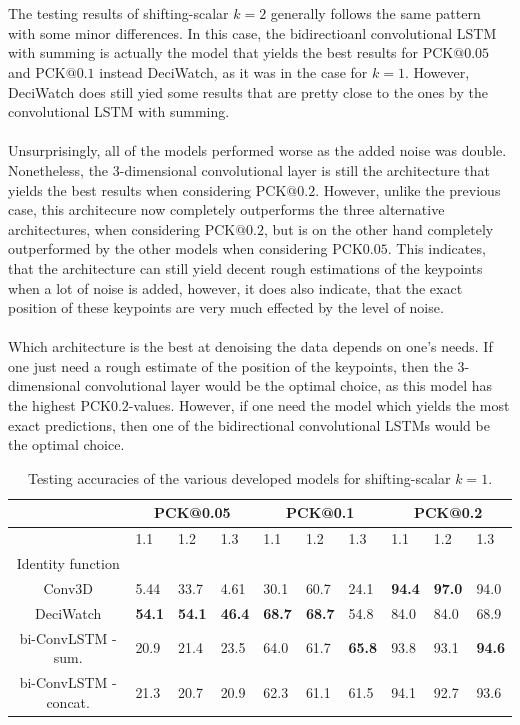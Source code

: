 \documentclass[./main.tex]{subfiles}
\begin{document}
\\
\\
The testing results of shifting-scalar $k = 2$ generally follows the same pattern with some minor differences. In this case, the bidirectioanl convolutional LSTM with summing is actually the model that yields the best results for PCK$@0.05$ and PCK$@0.1$ instead DeciWatch, as it was in the case for $k = 1$. However, DeciWatch does still yied some results that are pretty close to the ones by the convolutional LSTM with summing.
\\
\\
Unsurprisingly, all of the models performed worse as the added noise was double. Nonetheless, the 3-dimensional convolutional layer is still the architecture that yields the best results when considering PCK$@0.2$. However, unlike the previous case, this architecure now completely outperforms the three alternative architectures, when considering PCK$@0.2$, but is on the other hand completely outperformed by the other models when considering PCK$0.05$. This indicates, that the architecture can still yield decent rough estimations of the keypoints when a lot of noise is added, however, it does also indicate, that the exact position of these keypoints are very much effected by the level of noise.
\\
\\
Which architecture is the best at denoising the data depends on one's needs. If one just need a rough estimate of the position of the keypoints, then the 3-dimensional convolutional layer would be the optimal choice, as this model has the highest PCK$0.2$-values. However, if one need the model which yields the most exact predictions, then one of the bidirectional convolutional LSTMs would be the optimal choice.

\begin{table}[htbp]
    \begin{tabular}{c||lll|lll|lll}
        \hline
        & \multicolumn{3}{c}{PCK@0.05} & \multicolumn{3}{c}{PCK@0.1} & \multicolumn{3}{c}{PCK@0.2} \\
        \hline
        & 1.1 & 1.2 & 1.3 & 1.1 & 1.2 & 1.3 & 1.1 & 1.2 & 1.3 \\
        \hline
        Identity function & & & & & & & & & \\
        Conv3D & 5.44 & 33.7 & 4.61 & 30.1 & 60.7 & 24.1 & \textbf{94.4} & \textbf{97.0} & 94.0 \\
        DeciWatch & \textbf{54.1} & \textbf{54.1} & \textbf{46.4} & \textbf{68.7} & \textbf{68.7} & 54.8 & 84.0 & 84.0 & 68.9 \\
        bi-ConvLSTM - sum. & 20.9 & 21.4 & 23.5 & 64.0 & 61.7 & \textbf{65.8} & 93.8 & 93.1 & \textbf{94.6} \\
        bi-ConvLSTM - concat. & 21.3 & 20.7 & 20.9 & 62.3 & 61.1 & 61.5 & 94.1 & 92.7 & 93.6 \\
        \hline
    \end{tabular}
    \label{tab:pretrain_test_accs_1}
    \caption{Testing accuracies of the various developed models for shifting-scalar $k = 1$.}
\end{table}
\end{document}
